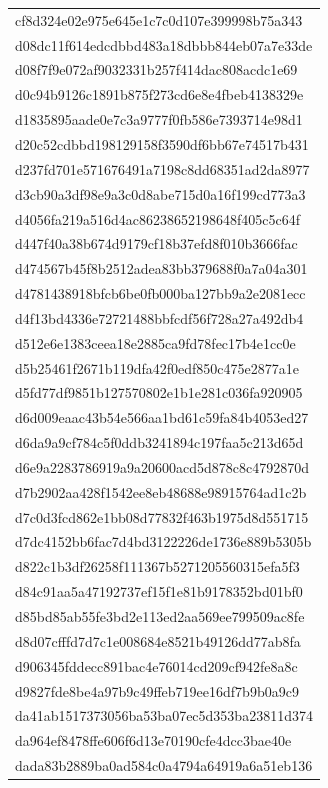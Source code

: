 \begin{tabular}{l}
cf8d324e02e975e645e1c7c0d107e399998b75a343 \\
d08dc11f614edcdbbd483a18dbbb844eb07a7e33de \\
d08f7f9e072af9032331b257f414dac808acdc1e69 \\
d0c94b9126c1891b875f273cd6e8e4fbeb4138329e \\
d1835895aade0e7c3a9777f0fb586e7393714e98d1 \\
d20c52cdbbd198129158f3590df6bb67e74517b431 \\
d237fd701e571676491a7198c8dd68351ad2da8977 \\
d3cb90a3df98e9a3c0d8abe715d0a16f199cd773a3 \\
d4056fa219a516d4ac86238652198648f405c5c64f \\
d447f40a38b674d9179cf18b37efd8f010b3666fac \\
d474567b45f8b2512adea83bb379688f0a7a04a301 \\
d4781438918bfcb6be0fb000ba127bb9a2e2081ecc \\
d4f13bd4336e72721488bbfcdf56f728a27a492db4 \\
d512e6e1383ceea18e2885ca9fd78fec17b4e1cc0e \\
d5b25461f2671b119dfa42f0edf850c475e2877a1e \\
d5fd77df9851b127570802e1b1e281c036fa920905 \\
d6d009eaac43b54e566aa1bd61c59fa84b4053ed27 \\
d6da9a9cf784c5f0ddb3241894c197faa5c213d65d \\
d6e9a2283786919a9a20600acd5d878c8c4792870d \\
d7b2902aa428f1542ee8eb48688e98915764ad1c2b \\
d7c0d3fcd862e1bb08d77832f463b1975d8d551715 \\
d7dc4152bb6fac7d4bd3122226de1736e889b5305b \\
d822c1b3df26258f111367b5271205560315efa5f3 \\
d84c91aa5a47192737ef15f1e81b9178352bd01bf0 \\
d85bd85ab55fe3bd2e113ed2aa569ee799509ac8fe \\
d8d07cfffd7d7c1e008684e8521b49126dd77ab8fa \\
d906345fddecc891bac4e76014cd209cf942fe8a8c \\
d9827fde8be4a97b9c49ffeb719ee16df7b9b0a9c9 \\
da41ab1517373056ba53ba07ec5d353ba23811d374 \\
da964ef8478ffe606f6d13e70190cfe4dcc3bae40e \\
dada83b2889ba0ad584c0a4794a64919a6a51eb136 \\

\end{tabular}
